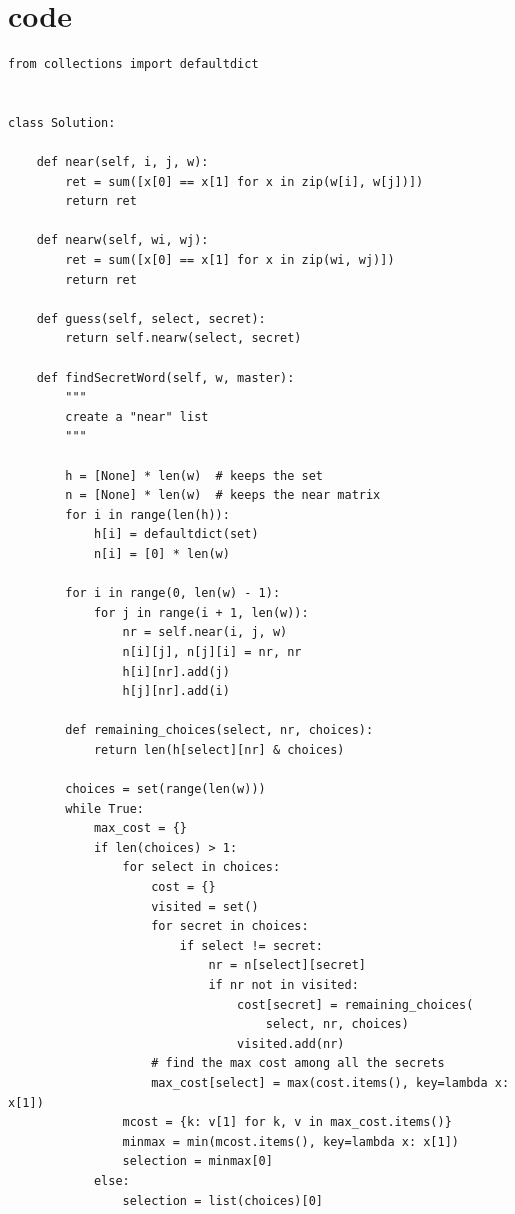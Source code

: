 \documentclass[11pt]{article}
\begin{document}
\section{code}
\label{sec:orgedd2015}
\begin{verbatim}
from collections import defaultdict


class Solution:

    def near(self, i, j, w):
        ret = sum([x[0] == x[1] for x in zip(w[i], w[j])])
        return ret

    def nearw(self, wi, wj):
        ret = sum([x[0] == x[1] for x in zip(wi, wj)])
        return ret

    def guess(self, select, secret):
        return self.nearw(select, secret)

    def findSecretWord(self, w, master):
        """
        create a "near" list
        """

        h = [None] * len(w)  # keeps the set
        n = [None] * len(w)  # keeps the near matrix
        for i in range(len(h)):
            h[i] = defaultdict(set)
            n[i] = [0] * len(w)

        for i in range(0, len(w) - 1):
            for j in range(i + 1, len(w)):
                nr = self.near(i, j, w)
                n[i][j], n[j][i] = nr, nr
                h[i][nr].add(j)
                h[j][nr].add(i)

        def remaining_choices(select, nr, choices):
            return len(h[select][nr] & choices)

        choices = set(range(len(w)))
        while True:
            max_cost = {}
            if len(choices) > 1:
                for select in choices:
                    cost = {}
                    visited = set()
                    for secret in choices:
                        if select != secret:
                            nr = n[select][secret]
                            if nr not in visited:
                                cost[secret] = remaining_choices(
                                    select, nr, choices)
                                visited.add(nr)
                    # find the max cost among all the secrets
                    max_cost[select] = max(cost.items(), key=lambda x: x[1])
                mcost = {k: v[1] for k, v in max_cost.items()}
                minmax = min(mcost.items(), key=lambda x: x[1])
                selection = minmax[0]
            else:
                selection = list(choices)[0]


\end{verbatim}
\end{document}
